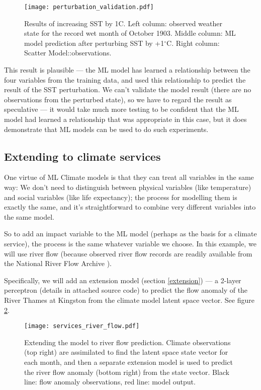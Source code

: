 \documentclass{ametsocV6.1}
\begin{document}
\begin{figure}[h]
\texttt{[image: perturbation\_validation.pdf]}
\caption{Results of increasing SST by 1C. Left column: observed weather state for the record wet month of October 1903. Middle column: ML model prediction after perturbing SST by +1$^\circ$C. Right column: Scatter Model::observations.}
\label{perturbation_validation}
\end{figure}
        
This result is plausible --- the ML model has learned a relationship between the four variables from the training data, and used this relationship to predict the result of the SST perturbation. We can't validate the model result (there are no observations from the perturbed state), so we have to regard the result as speculative --- it would take much more testing to be confident that the ML model had learned a relationship that was appropriate in this case, but it does demonstrate that ML models can be used to do such experiments.

\subsection{Extending to climate services}

One virtue of ML Climate models is that they can treat all variables in the same way: We don't need to distinguish between physical variables (like temperature) and social variables (like life expectancy); the process for modelling them is exactly the same, and it's straightforward to combine very different variables into the same model.

So to add an impact variable to the ML model (perhaps as the basis for a climate service), the process is the same whatever variable we choose. In this example, we will use river flow (because observed river flow records are readily available from the National River Flow Archive \citep{NRFA}).

Specifically, we will add an extension model (section \ref{extension}) --- a 2-layer perceptron (details in attached source code) to predict the flow anomaly of the River Thames at Kingston \citep{NRFA-Kingston} from the climate model latent space vector. See figure \ref{services_river_flow}.

\begin{figure}[h]
\texttt{[image: services\_river\_flow.pdf]}
\caption{Extending the model to river flow prediction. Climate observations (top right) are assimilated to find the latent space state vector for each month, and then a separate extension model is used to predict the river flow anomaly (bottom right) from the state vector. Black line: flow anomaly observations, red line: model output.}
\label{services_river_flow}
\end{figure}
         
\end{document}
